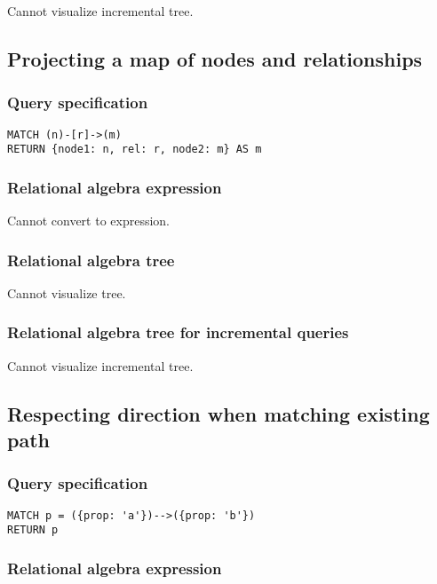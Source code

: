 Cannot visualize incremental tree.

\subsection{Projecting a map of nodes and relationships}

\subsubsection*{Query specification}

\begin{lstlisting}
MATCH (n)-[r]->(m)
RETURN {node1: n, rel: r, node2: m} AS m
\end{lstlisting}

\subsubsection*{Relational algebra expression}

Cannot convert to expression.

\subsubsection*{Relational algebra tree}

Cannot visualize tree.

\subsubsection*{Relational algebra tree for incremental queries}

Cannot visualize incremental tree.

\subsection{Respecting direction when matching existing path}

\subsubsection*{Query specification}

\begin{lstlisting}
MATCH p = ({prop: 'a'})-->({prop: 'b'})
RETURN p
\end{lstlisting}

\subsubsection*{Relational algebra expression}

